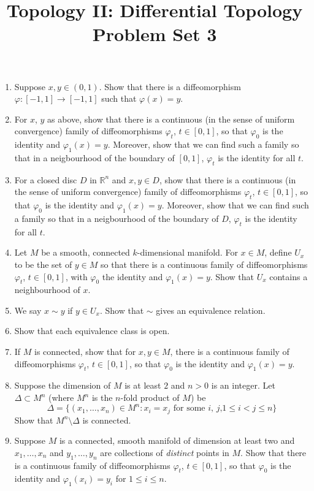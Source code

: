 \documentclass[12pt]{article}
\newcommand{\R}{\mathbb{R}}
\begin{document}
\title{Topology II: Differential Topology\\
Problem Set 3} 
\date{}
\maketitle

\thispagestyle{empty}

\begin{enumerate}

\item Suppose $x,y\in (0,1)$. Show that there is a diffeomorphism
$\varphi:[-1,1]\to [-1,1]$ such that $\varphi(x)=y$.

\item For $x$, $y$ as above, show that there is a continuous (in the
sense of uniform convergence) family of diffeomorphisms $\varphi_t$,
$t\in [0,1]$, so that $\varphi_0$ is the identity and
$\varphi_1(x)=y$. Moreover, show that we can find such a family so
that in a neigbourhood of the boundary of $[0,1]$, $\varphi_t$ is the
identity for all $t$.

\item For a closed disc $D$ in $\R^n$ and $x,y\in D$, show that there
is a continuous (in the sense of uniform convergence) family of
diffeomorphisms $\varphi_t$, $t\in [0,1]$, so that $\varphi_0$ is the
identity and $\varphi_1(x)=y$. Moreover, show that we can find such a
family so that in a neigbourhood of the boundary of $D$, $\varphi_t$
is the identity for all $t$.

\item Let $M$ be a smooth, connected $k$-dimensional manifold. For
$x\in M$, define $U_x$ to be the set of $y\in M$ so that there is a
continuous family of diffeomorphisms $\varphi_t$, $t\in [0,1]$, with
$\varphi_0$ the identity and $\varphi_1(x)=y$. Show that $U_x$
contains a neighbourhood of $x$.

\item We say $x\sim y$ if $y\in U_x$. Show that $\sim$ gives an
equivalence relation.

\item Show that each equivalence class is open.

\item If $M$ is connected, show that for $x,y\in M$, there is a
continuous family of diffeomorphisms $\varphi_t$, $t\in [0,1]$, so
that $\varphi_0$ is the identity and $\varphi_1(x)=y$.

\item Suppose the dimension of $M$ is at least $2$ and $n>0$ is an
integer. Let $\Delta\subset M^n$ (where $M^n$ is the $n$-fold product
of $M$) be
$$\Delta=\{(x_1,\dots,x_n)\in M^n: x_i=x_j\text{\ for some $i$, $j$,
$1\leq i<j\leq n$}\}$$ Show that $M^n\setminus\Delta$ is connected.

\item Suppose $M$ is a connected, smooth manifold of dimension at
least two and $x_1,\dots, x_n$ and $y_1,\dots,y_n$ are collections of
\textit{distinct }points in $M$. Show that there is a continuous
family of diffeomorphisms $\varphi_t$, $t\in [0,1]$, so that
$\varphi_0$ is the identity and $\varphi_1(x_i)=y_i$ for $1\leq i\leq
n$.

\end{enumerate}
\end{document}
